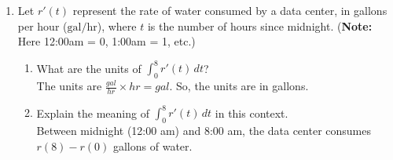 \documentclass[11pt]{article}
\begin{document}
\begin{enumerate}
{\begin{itemize}
\begin{table}[h!]
    \begin{tabular}{c|c|c}
      $y$  & $A'(y)=100-4y$ \\
      \hline
        $(0,25)$ & +  \\
        $(25,\infty)$ & - \\
    \end{tabular}
\end{table}\\
Hence, $y=25$ is a local maximum for $A(y)$.
(Similarly, can justify that $x=50$
is a local maximum of $A(x)$).
\item
Since $y=25$ is \textbf{the only critical number} of $A(y)$ on $[0,\infty)$,
by \textbf{the $1^\text{st}$ Derivative Test for Absolute Extrema},
it is an absolute maximum of $A(y)$.
(Similarly for $x=50$)
\item
\textbf{Answer:} $x=50$\ ft and $y=25$\ ft
maximize the area.
The maximum area is $50\cdot 25=1250$\ ft.
\end{itemize}}


\newpage


\item Let $r'(t)$ represent the rate of water consumed by a data center, in gallons per hour ($\text{gal/hr}$), where $t$ is the number of hours since midnight. (\textbf{Note:} Here 12:00am = 0, 1:00am = 1, etc.)
    


    \begin{enumerate}[i]
        \item What are the units of $\displaystyle\int_0^8 r'(t) \, dt$?\\
{\color{blue} The units are $\frac{gal}{hr} \times hr = gal$. So, the units are in gallons.}
        \vspace{6cm}

        \item Explain the meaning of $\displaystyle\int_0^8 r'(t) \, dt$ in this context.\\
        {\color{blue} Between midnight (12:00 am) and 8:00 am, the data  center consumes $r(8) - r(0)$ gallons of water.}
       \vspace{6cm}


\end{enumerate}
\end{enumerate}
\end{document}
